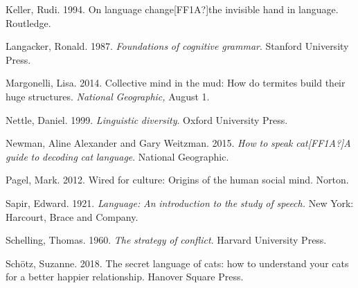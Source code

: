 \begin{stylereferences}
Keller, Rudi. 1994. On language change[FF1A?]the invisible hand in language. Routledge. 
\end{stylereferences}

\begin{stylereferences}
Langacker, Ronald. 1987. \textit{Foundations} \textit{of} \textit{cognitive} \textit{grammar}. Stanford University Press.
\end{stylereferences}

\begin{stylereferences}
Margonelli, Lisa. 2014. Collective mind in the mud: How do termites build their huge structures. \textit{National} \textit{Geographic,} August 1.
\end{stylereferences}

\begin{stylereferences}
Nettle, Daniel. 1999. \textit{Linguistic} \textit{diversity}. Oxford University Press.
\end{stylereferences}

\begin{stylereferences}
Newman, Aline Alexander and Gary Weitzman. 2015. \textit{How} \textit{to} \textit{speak} \textit{cat[FF1A?]A} \textit{guide} \textit{to} \textit{decoding} \textit{cat} \textit{language}. National Geographic.
\end{stylereferences}

\begin{stylereferences}
Pagel, Mark. 2012. Wired for culture: Origins of the human social mind. Norton.  
\end{stylereferences}

\begin{stylereferences}
Sapir, Edward. 1921. \textit{Language:} \textit{An} \textit{introduction} \textit{to} \textit{the} \textit{study} \textit{of} \textit{speech.} New York: Harcourt, Brace and Company.    
\end{stylereferences}

\begin{stylereferences}
Schelling, Thomas. 1960. \textit{The} \textit{strategy} \textit{of} \textit{conflict}. Harvard University Press.
\end{stylereferences}

\begin{stylereferences}
Schötz, Suzanne. 2018. The secret language of cats: how to understand your cats for a better happier relationship.  Hanover Square Press.
\end{stylereferences}

